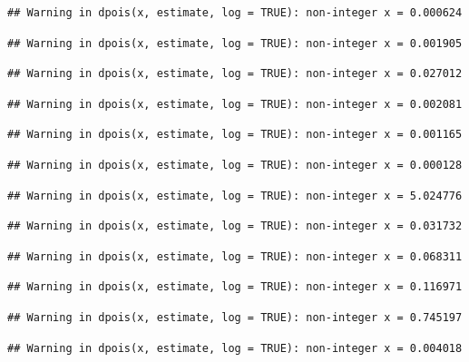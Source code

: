 \documentclass[]{article}
\begin{document}
\begin{verbatim}
## Warning in dpois(x, estimate, log = TRUE): non-integer x = 0.000624
\end{verbatim}

\begin{verbatim}
## Warning in dpois(x, estimate, log = TRUE): non-integer x = 0.001905
\end{verbatim}

\begin{verbatim}
## Warning in dpois(x, estimate, log = TRUE): non-integer x = 0.027012
\end{verbatim}

\begin{verbatim}
## Warning in dpois(x, estimate, log = TRUE): non-integer x = 0.002081
\end{verbatim}

\begin{verbatim}
## Warning in dpois(x, estimate, log = TRUE): non-integer x = 0.001165
\end{verbatim}

\begin{verbatim}
## Warning in dpois(x, estimate, log = TRUE): non-integer x = 0.000128
\end{verbatim}

\begin{verbatim}
## Warning in dpois(x, estimate, log = TRUE): non-integer x = 5.024776
\end{verbatim}

\begin{verbatim}
## Warning in dpois(x, estimate, log = TRUE): non-integer x = 0.031732
\end{verbatim}

\begin{verbatim}
## Warning in dpois(x, estimate, log = TRUE): non-integer x = 0.068311
\end{verbatim}

\begin{verbatim}
## Warning in dpois(x, estimate, log = TRUE): non-integer x = 0.116971
\end{verbatim}

\begin{verbatim}
## Warning in dpois(x, estimate, log = TRUE): non-integer x = 0.745197
\end{verbatim}

\begin{verbatim}
## Warning in dpois(x, estimate, log = TRUE): non-integer x = 0.004018
\end{verbatim}
\end{document}
